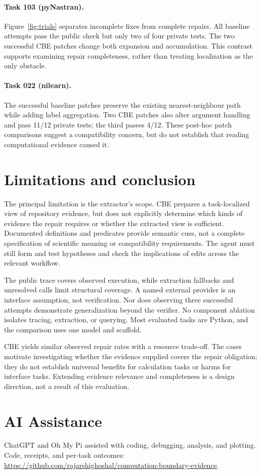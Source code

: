\documentclass[11pt,a4paper,twocolumn]{article}
\begin{document}
\paragraph{Task 103 (pyNastran).}
Figure~\ref{fig:trials} separates incomplete fixes from complete repairs. All baseline attempts pass the public check but only two of four private tests. The two successful CBE patches change both expansion and accumulation. This contrast supports examining repair completeness, rather than treating localization as the only obstacle.

\paragraph{Task 022 (nilearn).}
The successful baseline patches preserve the existing nearest-neighbour path while adding label aggregation. Two CBE patches also alter argument handling and pass 11/12 private tests; the third passes 4/12. These post-hoc patch comparisons suggest a compatibility concern, but do not establish that reading computational evidence caused it.

\section{Limitations and conclusion}
\label{sec:conclusion}
The principal limitation is the extractor's scope. CBE prepares a task-localized view of repository evidence, but does not explicitly determine which kinds of evidence the repair requires or whether the extracted view is sufficient. Documented definitions and predicates provide semantic cues, not a complete specification of scientific meaning or compatibility requirements. The agent must still form and test hypotheses and check the implications of edits across the relevant workflow.

The public trace covers observed execution, while extraction fallbacks and unresolved calls limit structural coverage. A named external provider is an interface assumption, not verification. Nor does observing three successful attempts demonstrate generalization beyond the verifier. No component ablation isolates tracing, extraction, or querying. Most evaluated tasks are Python, and the comparison uses one model and scaffold.

CBE yields similar observed repair rates with a resource trade-off. The cases motivate investigating whether the evidence supplied covers the repair obligation; they do not establish universal benefits for calculation tasks or harms for interface tasks. Extending evidence relevance and completeness is a design direction, not a result of this evaluation.

\section{AI Assistance}
ChatGPT and Oh My Pi assisted with coding, debugging, analysis, and plotting. Code, receipts, and per-task outcomes: \url{https://github.com/rajarshighoshal/computation-boundary-evidence}.

\clearpage

\end{document}
